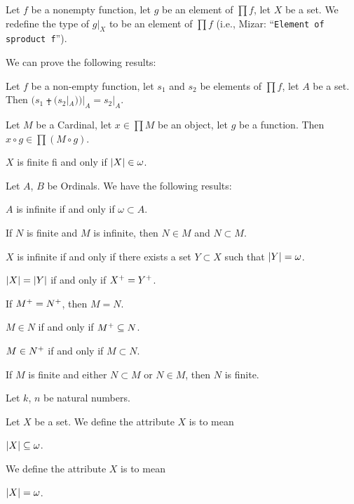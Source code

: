 \documentclass{article}
\begin{document}
\begin{definition}
Let $f$ be a nonempty function, let $g$ be an element of $\prod f$,
let $X$ be a set.
We redefine the type of $g|_{X}$ to be an element of $\prod f$ (i.e.,
Mizar: ``\verb#Element of sproduct f#'').
\end{definition}

We can prove the following results:
\begin{thm}
\item\label{card3:82} Let $f$ be a non-empty function, let $s_{1}$ and
  $s_{2}$ be elements of $\prod f$, let $A$ be a set.
  Then $(s_{1}\plusdot (s_{2}|_{A}))|_{A}=s_{2}|_{A}$.
\item\label{card3:83} Let $M$ be a Cardinal, let $x\in\prod M$ be an object, let 
  $g$ be a function. Then $x\circ g\in\prod(M\circ g)$.
\item\label{card3:84} $X$ is finite fi and only if $|X|\in\omega$.
\end{thm}

Let $A$, $B$ be Ordinals. We have the following results:
\begin{thm}
\item\label{card3:85} $A$ is infinite if and only if $\omega\subset A$.
\item\label{card3:86} If $N$ is finite and $M$ is infinite,
  then $N\in M$ and $N\subset M$.
\item\label{card3:87} $X$ is infinite if and only if there exists a set
  $Y\subset X$ such that $|Y|=\omega$.
\item\label{card3:88} $|X|=|Y|$ if and only if $X^{+}=Y^{+}$.
\item\label{card3:89} If $M^{+}=N^{+}$, then $M=N$.
\item\label{card3:90} $M\in N$ if and only if $M^{+}\subseteq N$.
\item\label{card3:91} $M\in N^{+}$ if and only if $M\subset N$.
\item\label{card3:92} If $M$ is finite and either $N\subset M$ or $N\in M$,
  then $N$ is finite.
\end{thm}

Let $k$, $n$ be natural numbers.

\begin{definition}
Let $X$ be a set.
We define the attribute $X$ is  to mean
\begin{defn} 
\item $|X|\subseteq\omega$.
\end{defn}
We define the attribute $X$ is  to mean
\begin{defn}
\item $|X|=\omega$.
\end{defn}
\end{definition}
\end{document}

